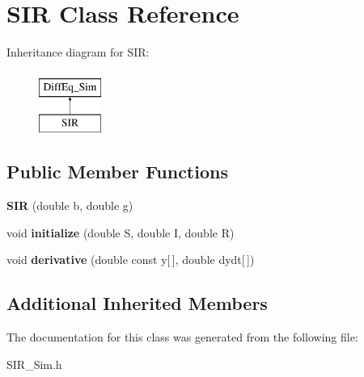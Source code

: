 \hypertarget{classSIR}{}\section{S\+I\+R Class Reference}
\label{classSIR}
Inheritance diagram for S\+I\+R\+:\begin{figure}[H]
\begin{center}
\leavevmode
\includegraphics[height=2.000000cm]{classSIR}
\end{center}
\end{figure}
\subsection*{Public Member Functions}
\begin{DoxyCompactItemize}
\item 
\hypertarget{classSIR_a398344819c9e0e32947922efb4c0433d}{}{\bfseries S\+I\+R} (double b, double g)\label{classSIR_a398344819c9e0e32947922efb4c0433d}

\item 
\hypertarget{classSIR_af7839bbe96120c50f2ce5bc6a4ea5fd9}{}void {\bfseries initialize} (double S, double I, double R)\label{classSIR_af7839bbe96120c50f2ce5bc6a4ea5fd9}

\item 
\hypertarget{classSIR_aee7ad4c67c83fcdb7848fa184199466c}{}void {\bfseries derivative} (double const y\mbox{[}$\,$\mbox{]}, double dydt\mbox{[}$\,$\mbox{]})\label{classSIR_aee7ad4c67c83fcdb7848fa184199466c}

\end{DoxyCompactItemize}
\subsection*{Additional Inherited Members}


The documentation for this class was generated from the following file\+:\begin{DoxyCompactItemize}
\item 
S\+I\+R\+\_\+\+Sim.\+h\end{DoxyCompactItemize}
